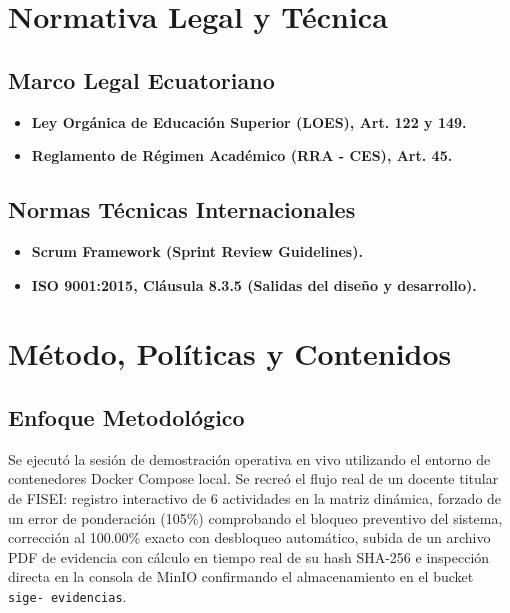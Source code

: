 \documentclass[12pt,a4paper]{article}
\begin{document}
\section{Normativa Legal y Técnica}
\subsection{Marco Legal Ecuatoriano}
\begin{itemize}[leftmargin=1.5em, itemsep=2pt]
    \item \textbf{Ley Orgánica de Educación Superior (LOES), Art. 122 y 149.}
    \item \textbf{Reglamento de Régimen Académico (RRA - CES), Art. 45.}
\end{itemize}
\subsection{Normas Técnicas Internacionales}
\begin{itemize}[leftmargin=1.5em, itemsep=2pt]
    \item \textbf{Scrum Framework (Sprint Review Guidelines).}
    \item \textbf{ISO 9001:2015, Cláusula 8.3.5 (Salidas del diseño y desarrollo).}
\end{itemize}

\section{Método, Políticas y Contenidos}
\subsection{Enfoque Metodológico}
Se ejecutó la sesión de demostración operativa en vivo utilizando el entorno de contenedores Docker Compose local. Se recreó el flujo real de un docente titular de FISEI: registro interactivo de 6 actividades en la matriz dinámica, forzado de un error de ponderación (105\%) comprobando el bloqueo preventivo del sistema, corrección al 100.00\% exacto con desbloqueo automático, subida de un archivo PDF de evidencia con cálculo en tiempo real de su hash SHA-256 e inspección directa en la consola de MinIO confirmando el almacenamiento en el bucket \texttt{sige- evidencias}.
\end{document}
